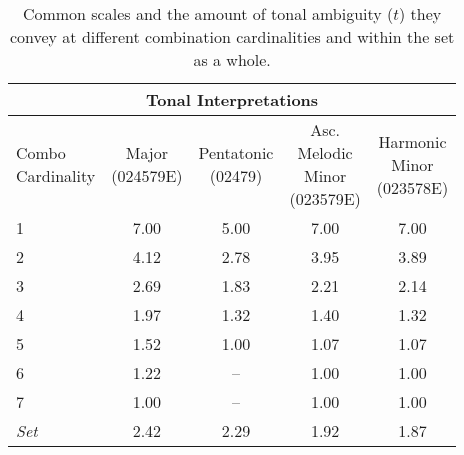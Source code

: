 \begin{table}[htbp]
\setlength{\tabcolsep}{2pt} %
\centering
\small
\caption{Common scales and the amount of tonal ambiguity ($t$) they convey at different
combination cardinalities and within the set as a whole.}
\label{tab:tonal-interpretations}
    \begin{tabular}{l c c c c}
    \toprule
    \multicolumn{5}{c}{\textbf{Tonal Interpretations}} \\
    \midrule
    \makecell[c]{Combo\\Cardinality} &
    \makecell[c]{Major\\(024579E)} &
    \makecell[c]{Pentatonic\\(02479)} &
    \makecell[c]{Asc.\\Melodic\\Minor\\(023579E)} &
    \makecell[c]{Harmonic\\Minor\\(023578E)} \\
    \midrule
    1 & 7.00 & 5.00 & 7.00 & 7.00 \\
    2 & 4.12 & 2.78 & 3.95 & 3.89 \\
    3 & 2.69 & 1.83 & 2.21 & 2.14 \\
    4 & 1.97 & 1.32 & 1.40 & 1.32 \\
    5 & 1.52 & 1.00 & 1.07 & 1.07 \\
    6 & 1.22 & --   & 1.00 & 1.00 \\
    7 & 1.00 & --   & 1.00 & 1.00 \\
    \midrule
    \textit{Set} & 2.42 & 2.29 & 1.92 & 1.87 \\
    \bottomrule
    \end{tabular}
\end{table}